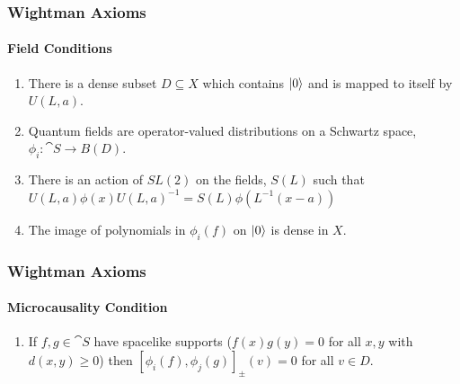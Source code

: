 \documentclass{beamer}
\begin{document}
\begin{frame}

\frametitle{Wightman Axioms}
\framesubtitle{Field Conditions}

\begin{enumerate}
\item {} There is a dense subset $D \subseteq X$ which contains $\ket{0}$ and is mapped to itself by $U(L,a)$.

\item {} Quantum fields are operator-valued distributions on a Schwartz space, $\phi_i: \cat{S} \to B(D)$.

\item {} There is an action of $SL(2)$ on the fields, $S(L)$ such that $U(L,a) \phi(x) U(L,a)^{-1} = S(L) \phi(L^{-1}(x - a))$

\item {} The image of polynomials in $\phi_i(f)$ on $\ket{0}$ is dense in $X$.
\end{enumerate}


\end{frame}




\begin{frame}

\frametitle{Wightman Axioms}
\framesubtitle{Microcausality Condition}

\begin{enumerate}

\item If $f,g \in \cat{S}$ have spacelike supports ($f(x) g(y) = 0$ for all $x,y$ with $d(x,y) \geq 0$) then $[\phi_i (f), \phi_j (g)]_{\pm}(v) = 0$ for all $v \in D$.


\end{enumerate}

\end{frame}






\end{document}
